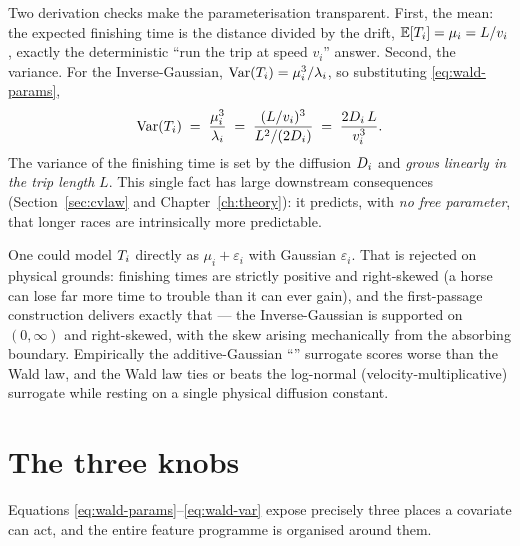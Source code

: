 Two derivation checks make the parameterisation transparent. First, the mean: the expected
finishing time is the distance divided by the drift,
$\mathbb{E}[T_i] = \mu_i = L/v_i$, exactly the deterministic ``run the trip at speed $v_i$'' answer.
Second, the variance. For the Inverse-Gaussian, $\operatorname{Var}(T_i)=\mu_i^3/\lambda_i$, so
substituting \eqref{eq:wald-params},
\begin{equation}
  \operatorname{Var}(T_i)
   \;=\; \frac{\mu_i^3}{\lambda_i}
   \;=\; \frac{(L/v_i)^3}{L^2/(2D_i)}
   \;=\; \frac{2D_i\,L}{v_i^{3}}.
  \label{eq:wald-var}
\end{equation}
The variance of the finishing time is set by the diffusion $D_i$ and \emph{grows linearly in
the trip length} $L$. This single fact has large downstream consequences (Section~\ref{sec:cvlaw}
and Chapter~\ref{ch:theory}): it predicts, with \emph{no free parameter}, that longer races are
intrinsically more predictable.

\begin{remark}
One could model $T_i$ directly as $\mu_i + \varepsilon_i$ with Gaussian $\varepsilon_i$. That
is rejected on physical grounds: finishing times are strictly positive and right-skewed (a horse
can lose far more time to trouble than it can ever gain), and the first-passage construction
delivers exactly that --- the Inverse-Gaussian is supported on $(0,\infty)$ and right-skewed,
with the skew arising mechanically from the absorbing boundary. Empirically the additive-Gaussian
``'' surrogate scores worse than the Wald law, and the Wald law ties or beats the
log-normal (velocity-multiplicative) surrogate while resting on a single physical diffusion
constant.
\end{remark}

\section{The three knobs}
\label{sec:threeknobs}

Equations \eqref{eq:wald-params}--\eqref{eq:wald-var} expose precisely three places a covariate
can act, and the entire feature programme is organised around them.

